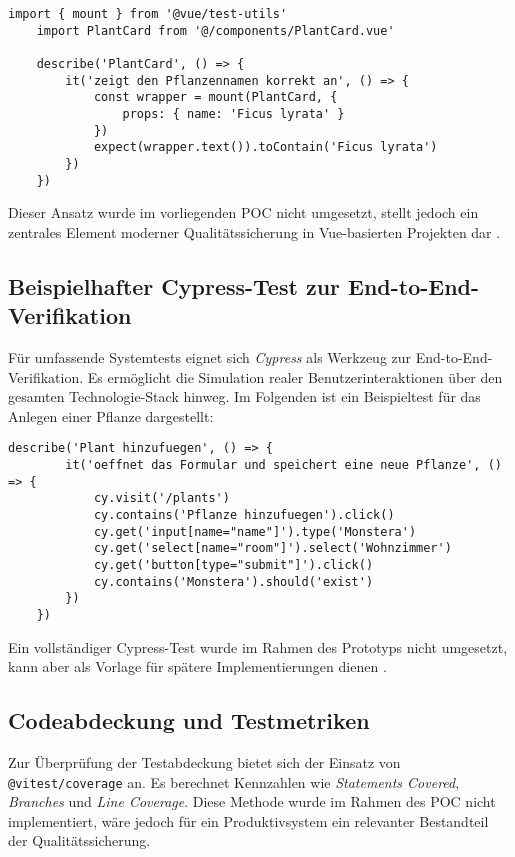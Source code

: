 \begin{lstlisting}[caption=Beispielhafter Unit-Test mit Vue Test Utils]
	import { mount } from '@vue/test-utils'
	import PlantCard from '@/components/PlantCard.vue'
	
	describe('PlantCard', () => {
		it('zeigt den Pflanzennamen korrekt an', () => {
			const wrapper = mount(PlantCard, {
				props: { name: 'Ficus lyrata' }
			})
			expect(wrapper.text()).toContain('Ficus lyrata')
		})
	})
\end{lstlisting}

Dieser Ansatz wurde im vorliegenden \ac{POC} nicht umgesetzt, stellt jedoch ein zentrales Element moderner Qualitätssicherung in Vue-basierten Projekten dar \cite{VueTestUtils2024}.

\subsection{Beispielhafter Cypress-Test zur End-to-End-Verifikation}

Für umfassende Systemtests eignet sich \emph{Cypress} als Werkzeug zur End-to-End-Verifikation. Es ermöglicht die Simulation realer Benutzerinteraktionen über den gesamten Technologie-Stack hinweg. Im Folgenden ist ein Beispieltest für das Anlegen einer Pflanze dargestellt:

\begin{lstlisting}[caption=Beispielhafter Cypress-Test]
	describe('Plant hinzufuegen', () => {
		it('oeffnet das Formular und speichert eine neue Pflanze', () => {
			cy.visit('/plants')
			cy.contains('Pflanze hinzufuegen').click()
			cy.get('input[name="name"]').type('Monstera')
			cy.get('select[name="room"]').select('Wohnzimmer')
			cy.get('button[type="submit"]').click()
			cy.contains('Monstera').should('exist')
		})
	})
\end{lstlisting}

Ein vollständiger Cypress-Test wurde im Rahmen des Prototyps nicht umgesetzt, kann aber als Vorlage für spätere Implementierungen dienen \cite{CypressDocs2024}.

\subsection{Codeabdeckung und Testmetriken}

Zur Überprüfung der Testabdeckung bietet sich der Einsatz von \texttt{@vitest/coverage} an. Es berechnet Kennzahlen wie \emph{Statements Covered}, \emph{Branches} und \emph{Line Coverage}. Diese Methode wurde im Rahmen des \ac{POC} nicht implementiert, wäre jedoch für ein Produktivsystem ein relevanter Bestandteil der Qualitätssicherung.

